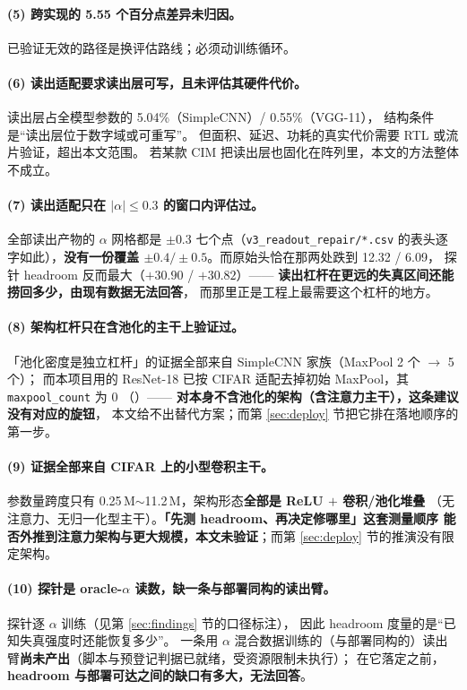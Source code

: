 \documentclass[11pt,a4paper]{ctexart}
\begin{document}
\paragraph{(5) 跨实现的 5.55 个百分点差异未归因。}
已验证无效的路径是换评估路线；必须动训练循环。

\paragraph{(6) 读出适配要求读出层可写，且未评估其硬件代价。}
读出层占全模型参数的 5.04\%（SimpleCNN）/ 0.55\%（VGG-11），
结构条件是“读出层位于数字域或可重写”。
但面积、延迟、功耗的真实代价需要 RTL 或流片验证，超出本文范围。
若某款 CIM 把读出层也固化在阵列里，本文的方法整体不成立。

\paragraph{(7) 读出适配只在 $|\alpha|\le0.3$ 的窗口内评估过。}
全部读出产物的 $\alpha$ 网格都是 $\pm0.3$ 七个点（\texttt{v3\_readout\_repair/*.csv}
的表头逐字如此），\textbf{没有一份覆盖 $\pm0.4/\pm0.5$}。而原始头恰在那两处跌到 12.32 / 6.09，
探针 headroom 反而最大（$+30.90$ / $+30.82$）——
\textbf{读出杠杆在更远的失真区间还能捞回多少，由现有数据无法回答}，
而那里正是工程上最需要这个杠杆的地方。

\paragraph{(8) 架构杠杆只在含池化的主干上验证过。}
「池化密度是独立杠杆」的证据全部来自 SimpleCNN 家族（MaxPool 2 个 $\to$ 5 个）；
而本项目用的 ResNet-18 已按 CIFAR 适配去掉初始 MaxPool，其 \texttt{maxpool\_count} 为 0
（）——
\textbf{对本身不含池化的架构（含注意力主干），这条建议没有对应的旋钮}，
本文给不出替代方案；而第 \ref{sec:deploy} 节把它排在落地顺序的第一步。

\paragraph{(9) 证据全部来自 CIFAR 上的小型卷积主干。}
参数量跨度只有 0.25\,M$\sim$11.2\,M，架构形态\textbf{全部是 ReLU $+$ 卷积/池化堆叠}
（无注意力、无归一化型主干）。\textbf{「先测 headroom、再决定修哪里」这套测量顺序
能否外推到注意力架构与更大规模，本文未验证}；而第 \ref{sec:deploy} 节的推演没有限定架构。

\paragraph{(10) 探针是 oracle-$\alpha$ 读数，缺一条与部署同构的读出臂。}
探针逐 $\alpha$ 训练（见第 \ref{sec:findings} 节的口径标注），
因此 headroom 度量的是“已知失真强度时还能恢复多少”。
一条用 $\alpha$ 混合数据训练的（与部署同构的）读出臂\textbf{尚未产出}（脚本与预登记判据已就绪，受资源限制未执行）；
在它落定之前，\textbf{headroom 与部署可达之间的缺口有多大，无法回答}。
\end{document}
